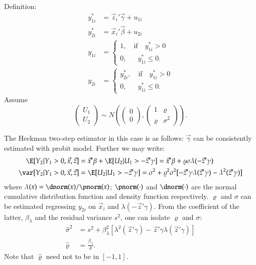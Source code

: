 \documentclass[a4paper]{article}
\numberwithin{equation}{subsection}
\begin{document}
Definition:
\begin{align}
  y_{1i}^* &= \vec{z}_i' \vec{\gamma} + u_{1i}
  \\
  y_{2i}^* &= \vec{x}_i' \vec{\beta} + u_{2i}
  \\
  y_{1i} &=
  \begin{cases}
    1, \quad \text{if} \quad y_{1i}^* > 0\\
    0, \quad \phantom{\text{if}} y_{1i}^* \le 0.
  \end{cases}
  \\
  y_{2i} &=
  \begin{cases}
    y_{2i}^*, \quad \text{if} \quad y_{1i}^* > 0\\
    0, \quad \phantom{\text{if}} y_{1i}^* \le 0.
  \end{cases}
\end{align}
Assume
\begin{equation}
  \begin{pmatrix}
    U_{1}\\
    U_{2}
  \end{pmatrix}
 \sim 
 N \left( 
   \begin{pmatrix}
     0 \\ 0
   \end{pmatrix},
  \begin{pmatrix}
  1             & \varrho \\
  \varrho       & \sigma^2
  \end{pmatrix}
\right).
\end{equation}

The Heckman two-step estimator in this case is as follows:
$\vec{\gamma}$ can be consistently estimated with probit model.
Further we may write:
\begin{align}
  \E [Y_2|Y_1 > 0, \vec{x}, \vec{z}] &=
  \vec{x}' \beta + \E [U_2|U_1 > -\vec{z}' \gamma]
  = \vec{x}' \beta + \varrho\sigma\lambda(-\vec{z}' \gamma)
  \\
  \var [Y_2|Y_1 > 0, \vec{x}, \vec{z}] &=
  \E [U_2|U_1 > -\vec{z}' \gamma]
  = \sigma^2 + \varrho^2 \sigma^2
  [-\vec{z}' \gamma \lambda(\vec{z}' \gamma)
  - \lambda^2(\vec{z}' \gamma)]
\end{align}
where $\lambda(x) = \dnorm(x) / \pnorm(x)$; $\pnorm(\cdot)$ and
$\dnorm(\cdot)$ are the normal cumulative distribution function and
density function respectively.  $\varrho$ and $\sigma$ can be
estimated regressing $y_{2i}$ on $\vec{x}_i$ and $\lambda(-\vec{z}'
\gamma)$.  From the coefficient of the latter, $\beta_\lambda$ and the
residual variance $s^2$, one can isolate $\varrho$ and $\sigma$:
\begin{align}
  \hat\sigma^2 &=
  s^2 + \beta_\lambda^2 [\lambda^2(\vec{z}' \gamma) - 
  \vec{z}' \gamma \lambda(\vec{z}' \gamma)]
  \\
  \hat\varrho &=
  \frac{\beta_\lambda}{\hat\sigma}.
\end{align}
Note that $\hat\varrho$ need not to be in $[-1,1]$.
\end{document}
